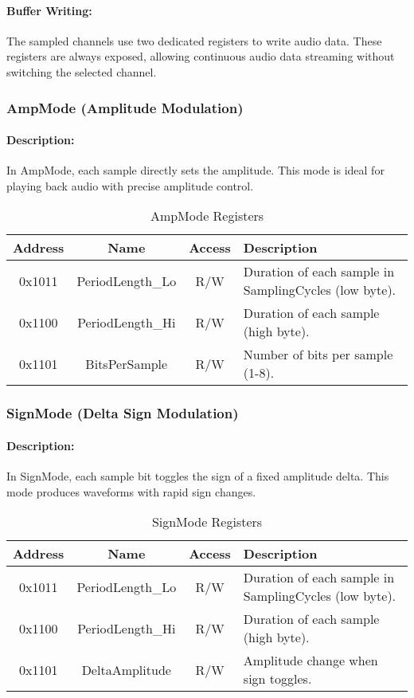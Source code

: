 \paragraph{Buffer Writing:}
The sampled channels use two dedicated registers to write audio data. These registers are always exposed, allowing continuous audio data streaming without switching the selected channel.

\subsubsection{AmpMode (Amplitude Modulation)}
\paragraph{Description:}
In AmpMode, each sample directly sets the amplitude. This mode is ideal for playing back audio with precise amplitude control.

\begin{table}[H]
    \centering
    \begin{tabular}{|c|c|c|l|}
        \hline
        \textbf{Address} & \textbf{Name}        & \textbf{Access} & \textbf{Description} \\
        \hline
        0x1011 & PeriodLength\_Lo & R/W & Duration of each sample in SamplingCycles (low byte). \\
        0x1100 & PeriodLength\_Hi & R/W & Duration of each sample (high byte). \\
        0x1101 & BitsPerSample    & R/W & Number of bits per sample (1-8). \\
        \hline
    \end{tabular}
    \caption{AmpMode Registers}
\end{table}

\subsubsection{SignMode (Delta Sign Modulation)}
\paragraph{Description:}
In SignMode, each sample bit toggles the sign of a fixed amplitude delta. This mode produces waveforms with rapid sign changes.

\begin{table}[H]
    \centering
    \begin{tabular}{|c|c|c|l|}
        \hline
        \textbf{Address} & \textbf{Name}        & \textbf{Access} & \textbf{Description} \\
        \hline
        0x1011 & PeriodLength\_Lo & R/W & Duration of each sample in SamplingCycles (low byte). \\
        0x1100 & PeriodLength\_Hi & R/W & Duration of each sample (high byte). \\
        0x1101 & DeltaAmplitude   & R/W & Amplitude change when sign toggles. \\
        \hline
    \end{tabular}
    \caption{SignMode Registers}
\end{table}


